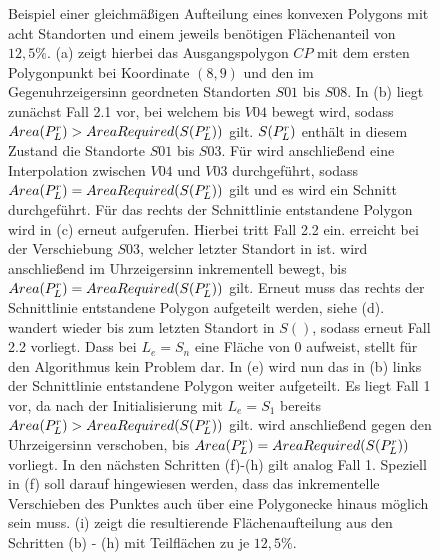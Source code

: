 \documentclass[ngerman]{seminarbeitrag}
\begin{document}
\begin{figure}[h]
\caption{\small Beispiel einer gleichmäßigen Aufteilung eines konvexen Polygons mit acht Standorten und einem jeweils benötigen Flächenanteil von $12,5\%$. (a) zeigt hierbei das Ausgangspolygon $CP$ mit dem ersten Polygonpunkt bei Koordinate $(8, 9)$ und den im Gegenuhrzeigersinn geordneten Standorten $S01$ bis $S08$. In (b) liegt zunächst Fall 2.1 vor, bei welchem \Le bis $V04$ bewegt wird, sodass $Area(P_{L}^{r}) > AreaRequired(S(P_{L}^{r}))$ gilt. $S(P_{L}^{r})$ enthält in diesem Zustand die Standorte $S01$ bis $S03$. Für \Le wird anschließend eine Interpolation zwischen $V04$ und $V03$ durchgeführt, sodass $Area(P_{L}^{r}) = AreaRequired(S(P_{L}^{r}))$ gilt und es wird ein Schnitt durchgeführt. Für das rechts der Schnittlinie entstandene Polygon wird in (c) erneut \con aufgerufen. Hierbei tritt Fall 2.2 ein. \Le erreicht bei der Verschiebung $S03$, welcher letzter Standort in \s ist. \ls wird anschließend im Uhrzeigersinn inkrementell bewegt, bis $Area(P_{L}^{r}) = AreaRequired(S(P_{L}^{r}))$ gilt. Erneut muss das rechts der Schnittlinie entstandene Polygon aufgeteilt werden, siehe (d). \Le wandert wieder bis zum letzten Standort in $S()$, sodass erneut Fall 2.2 vorliegt. Dass \ar{\mprl} bei $L_{e} = S_{n}$ eine Fläche von 0 aufweist, stellt für den Algorithmus kein Problem dar. In (e) wird nun das in (b) links der Schnittlinie entstandene Polygon weiter aufgeteilt. Es liegt Fall 1 vor, da nach der Initialisierung mit $L_{e} = S_{1}$ bereits $Area(P_{L}^{r}) > AreaRequired(S(P_{L}^{r}))$ gilt. \ls wird anschließend gegen den Uhrzeigersinn verschoben, bis $Area(P_{L}^{r}) = AreaRequired(S(P_{L}^{r}))$ vorliegt. In den nächsten Schritten (f)-(h) gilt analog Fall 1. Speziell in (f) soll darauf hingewiesen werden, dass das inkrementelle Verschieben des Punktes \ls auch über eine Polygonecke hinaus möglich sein muss. (i) zeigt die resultierende Flächenaufteilung aus den Schritten (b) - (h) mit Teilflächen zu je $12,5\%$.}
\label{beispiel konvex}
\end{figure}
\end{document}
